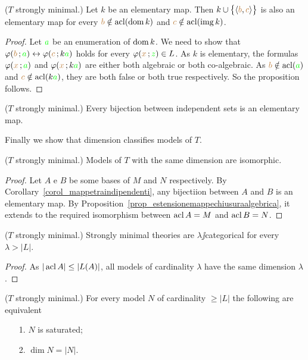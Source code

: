 \begin{proposition}\label{prop_mappetraindipendenti} 
($T$ strongly minimal.) Let $k$ be an elementary map.
Then $k\cup\big\{\langle{\color{brown}b},{\color{brown} c}\rangle\big\}$ is also an elementary map for every ${\color{brown} b}\notin\mathop{\rm acl}(\mathop{\rm dom} k)$ and ${\color{brown} c}\notin\mathop{\rm acl}(\mathop{\rm img} k)$.
\end{proposition}
\begin{proof}
Let ${\color{green} a}$ be an enumeration of $\mathop{\rm dom} k$.
We need to show that $\varphi({\color{brown} b}\,;{\color{green} a})\leftrightarrow\varphi({\color{brown} c}\,;k{\color{green} a})$ holds for every $\varphi({\color{brown} x}\,;{\color{green} z})\in L$.
As $k$ is elementary, the formulas $\varphi({\color{brown} x}\,;{\color{green} a})$ and $\varphi({\color{brown} x}\,;k{\color{green} a})$ are either both algebraic or both co-algebraic.
As ${\color{brown} b}\notin\mathop{\rm acl}({\color{green} a})$ and ${\color{brown} c}\notin\mathop{\rm acl}(k{\color{green} a})$, they are both false or both true respectively.
So the proposition follows.
\end{proof}

\begin{corollary}\label{corol_mappetraindipendenti} 
($T$ strongly minimal.) Every bijection between independent sets is an elementary map.\QED
\end{corollary}

Finally we show that dimension classifies models of $T$.

\begin{theorem}
($T$ strongly minimal.) Models of $T$ with the same dimension are isomorphic.
\end{theorem}
\begin{proof}
Let $A$ e $B$ be some bases of $M$ and $N$ respectively.
By Corollary~\ref{corol_mappetraindipendenti}, any bijectiion between $A$ and $B$ is an elementary map.
By Proposition~\ref{prop_estensionemappechiusuraalgebrica}, it extends to the required isomorphism between $\mathop{\rm acl} A=M$ and $\mathop{\rm acl} B=N$.
\end{proof}

\begin{corollary} 
($T$ strongly minimal.) Strongly minimal theories are $\lambda\jj$categorical for every $\lambda>|L|$.
\end{corollary}
\begin{proof}
As $|\mathop{\rm acl} A|\le |L(A)|$, all models of cardinality $\lambda$ have the same dimension $\lambda$.
\end{proof}

\begin{proposition} 
($T$ strongly minimal.) For every model $N$ of cardinality $\ge|L|$ the following are equivalent
\begin{itemize}
\item[1.] $N$ is saturated;
\item[2.] $\dim N=|N|$.
\end{itemize}
\end{proposition}

